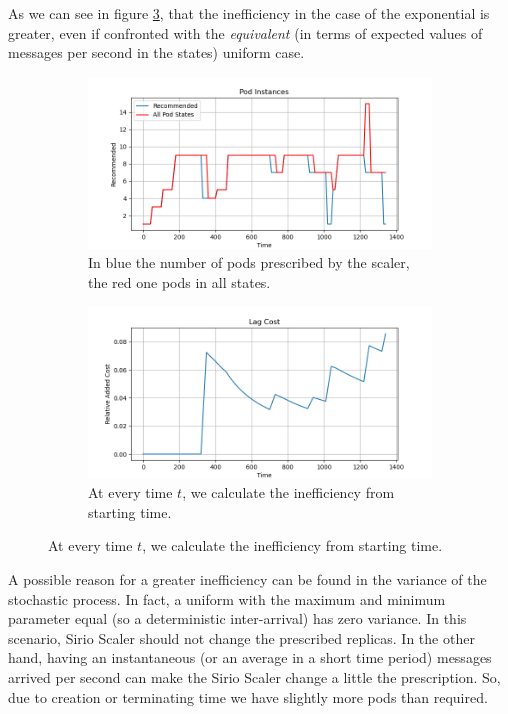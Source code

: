 As we can see in figure \ref{fig:exponential_fast_inefficiency}, that the inefficiency in the case of the exponential is greater, even if confronted with the \textit{equivalent} (in terms of expected values of messages per second in the states) uniform case. 

\begin{figure}
    \centering
    \begin{subfigure}{0.85\textwidth}
        \centering
        \includegraphics[width=\textwidth]{images/sliding_window/constant/pods.png}
        \caption{In blue the number of pods prescribed by the scaler, the red one pods in all states.}
        \label{fig:exponential_fast_pods}
    \end{subfigure}
    \begin{subfigure}{0.85\textwidth}
        \includegraphics[width=\linewidth]{images/sliding_window/constant/lag_cost_cumulative.png}
        \caption{At every time $t$, we calculate the inefficiency from starting time.}
        \label{fig:exponential_fast_inefficiency}
    \end{subfigure}
\end{figure}

A possible reason for a greater inefficiency can be found in the variance of the stochastic process. In fact, a uniform with the maximum and minimum parameter equal (so a deterministic inter-arrival) has zero variance. In this scenario, Sirio Scaler should not change the prescribed replicas. In the other hand, having an instantaneous (or an average in a short time period) messages arrived per second can make the Sirio Scaler change a little the prescription. So, due to creation or terminating time we have slightly more pods than required.
